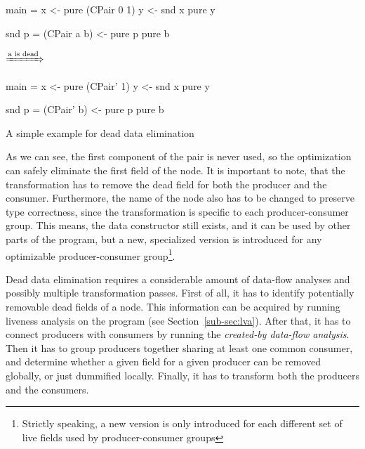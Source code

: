 \documentclass[main.tex]{subfiles}
\begin{document}
	\begin{codeFloat}[h]
		\begin{center}
			\begin{minipage}{0.42\textwidth}
				\begin{haskell}
					main = 
					  x <- pure (CPair 0 1)
					  y <- snd x
					  pure y 
					
					snd p =
					  (CPair a b) <- pure p
					  pure b
				\end{haskell}
			\end{minipage}
			$\xRightarrow{\text{\emph{a} is dead}}$
			\begin{minipage}{0.4\textwidth}
				\begin{haskell}
					main = 
					  x <- pure (CPair' 1)
					  y <- snd x
					  pure y 
					
					snd p =
					  (CPair' b) <- pure p
					  pure b
				\end{haskell}
			\end{minipage}
		\end{center}
		\caption{A simple example for dead data elimination}
		\label{code:dde-simple}
	\end{codeFloat}

	As we can see, the first component of the pair is never used, so the optimization can safely eliminate the first field of the node. It is important to note, that the transformation has to remove the dead field for both the producer and the consumer. Furthermore, the name of the node also has to be changed to preserve type correctness, since the transformation is specific to each producer-consumer group. This means, the data constructor  still exists, and it can be used by other parts of the program, but a new, specialized version is introduced for any optimizable producer-consumer group\footnote{Strictly speaking, a new version is only introduced for each different set of live fields used by producer-consumer groups}.
	
	Dead data elimination requires a considerable amount of data-flow analyses and possibly multiple transformation passes. First of all, it has to identify potentially removable dead fields of a node. This information can be acquired by running liveness analysis on the program (see Section~\ref{sub-sec:lva}). After that, it has to connect producers with consumers by running the \emph{created-by data-flow analysis}. Then it has to group producers together sharing at least one common consumer, and determine whether a given field for a given producer can be removed globally, or just dummified locally. Finally, it has to transform both the producers and the consumers.
	
\end{document}
